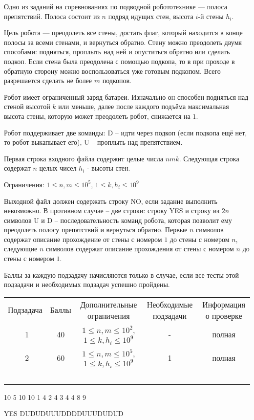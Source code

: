 
Одно из заданий на соревнованиях по подводной робототехнике — полоса препятствий. Полоса состоит из $n$ подряд идущих стен, высота $i$-й стены $h_i$. 

Цель робота — преодолеть все стены, достать флаг, который находится в конце полосы за всеми стенами, и вернуться обратно. Стену можно преодолеть двумя способами: подняться, проплыть над ней и опуститься обратно или сделать подкоп. Если стена была преодолена с помощью подкопа, то в при проходе в обратную сторону можно воспользоваться уже готовым подкопом. Всего разрешается сделать не более $m$ подкопов.

Робот имеет ограниченный заряд батареи. Изначально он способен подняться над стеной высотой $k$ или меньше, далее после каждого подъёма максимальная высота стены, которую может преодолеть робот, снижается на $1$. 

Робот поддерживает две команды: D -- идти через подкоп (если подкопа ещё нет, то робот выкапывает его), U -- проплыть над препятствием.


Первая строка входного файла содержит целые числа $n m k$.
Следующая строка содержат $n$ целых чисел $h_i$ - высоты стен.

Ограничения:
$1 \le n, m \le 10^5$, $1 \le k, h_i \le 10^9$

\outputfmtSection

Выходной файл должен содержать строку NO, если задание выполнить невозможно. В противном случае -- две строки: строку YES и строку из $2n$ символов U и D -- последовательность команд робота, которая позволит ему преодолеть полосу препятствий и вернуться обратно. Первые $n$ символов содержат описание прохождение от стены с номером $1$ до стены с номером $n$, следующие $n$ символов содержат описание прохождения от стены с номером $n$ до стены с номером $1$.

\markSection

Баллы за каждую подзадачу начисляются только в случае, если все тесты этой
подзадачи и необходимых подзадач успешно пройдены.

\begin{tabular}{|c|c|c|c|c|}
Подзадача&Баллы&Дополнительные ограничения&Необходимые подзадачи&Информация о проверке \\\
1&40&$1 \le n, m \le 10^2$, $1 \le k, h_i \le 10^9$&-&полная\\\
2&60&$1 \le n, m \le 10^5$, $1 \le k, h_i \le 10^9$&1&полная\\\
\end{tabular}



\begin{myverbbox}[\small]{\vinput}
    10 5 10
    10 1 4 2 4 3 4 4 8 9
\end{myverbbox}
\begin{myverbbox}[\small]{\voutput}
    YES
    DUDUDUUUDDDDUUUDUDUD
\end{myverbbox}


